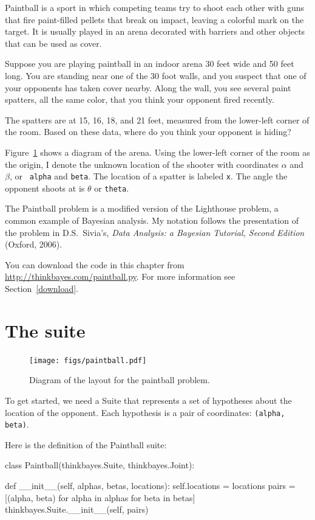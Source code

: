 \documentclass[12pt]{book}
\theoremstyle{exercise}
\begin{document}
Paintball is a sport in which competing teams try to shoot each other
with guns that fire paint-filled pellets that break on impact, leaving
a colorful mark on the target.  It is usually played in an
arena decorated with barriers and other objects that can be
used as cover.

Suppose you are playing paintball in an indoor arena 30 feet
wide and 50 feet long.  You are standing near one of the 30 foot
walls, and you suspect that one of your opponents has taken cover
nearby.  Along the wall, you see several paint spatters, all the same
color, that you think your opponent fired recently.

The spatters are at 15, 16, 18, and 21 feet, measured from the
lower-left corner of the room.  Based on these data, where do you
think your opponent is hiding?

Figure~\ref{fig.paintball} shows a diagram of the arena.  Using the
lower-left corner of the room as the origin, I denote the unknown
location of the shooter with coordinates $\alpha$ and $\beta$, or {\tt
  alpha} and {\tt beta}.  The location of a spatter is labeled
{\tt x}.  The angle the opponent shoots at is $\theta$ or {\tt theta}.

The Paintball problem is a modified version
of the Lighthouse problem, a common example of Bayesian analysis.  My
notation follows the presentation of the problem in D.S.~Sivia's, {\it Data
  Analysis: a Bayesian Tutorial, Second Edition} (Oxford, 2006).

You can download the code in this chapter from
\url{http://thinkbayes.com/paintball.py}.  For more information see
Section~\ref{download}.


\section{The suite}

\begin{figure}
\centerline{\texttt{[image: figs/paintball.pdf]}}
\caption{Diagram of the layout for the paintball problem.}
\label{fig.paintball}
\end{figure}

To get started, we need a Suite that represents a set of hypotheses
about the location of the opponent.  Each hypothesis is a
pair of coordinates: {\tt (alpha, beta)}.

Here is the definition of the Paintball suite:

\begin{code}
class Paintball(thinkbayes.Suite, thinkbayes.Joint):

    def __init__(self, alphas, betas, locations):
        self.locations = locations
        pairs = [(alpha, beta) 
                 for alpha in alphas 
                 for beta in betas]
        thinkbayes.Suite.__init__(self, pairs)
\end{code}
\end{document}
